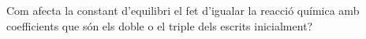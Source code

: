 \begin{exr}
Com afecta la constant d'equilibri el fet d'igualar la reacció química amb coefficients que són els doble o el triple dels escrits inicialment?
\end{exr}
